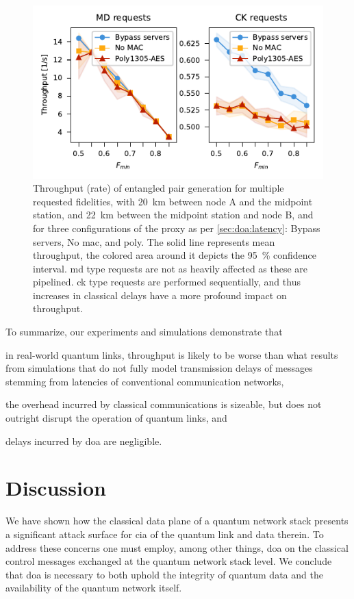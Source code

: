 \begin{figure}[t]
    \centering
    \includegraphics[width=0.6\linewidth]{figures/throughput-vs-fidelity.pdf}
    \caption{
        Throughput (rate) of entangled pair generation for multiple requested fidelities, with
        \qty{20}{\km} between node A and the midpoint station, and \qty{22}{\km} between the
        midpoint station and node B, and for three configurations of the proxy as per
        \cref{sec:doa:latency}: Bypass servers, No \acrshort{mac}, and \acrshort{poly}. The solid line
        represents mean throughput, the colored area around it depicts the \qty{95}{\percent}
        confidence interval. \Acrfull{md} type requests are not as heavily affected as these are
        pipelined. \Acrfull{ck} type requests are performed sequentially, and thus increases in
        classical delays have a more profound impact on throughput.
    }
    \label{fig:results-fidelity}
\end{figure}

To summarize, our experiments and simulations demonstrate that
%
\begin{inlinelist}
    \item in real-world quantum links, throughput is likely to be worse than what results from
          simulations that do not fully model transmission delays of messages stemming from
          latencies of conventional communication networks,
    \item the overhead incurred by classical communications is sizeable, but does not outright
          disrupt the operation of quantum links, and
    \item delays incurred by \acrlong{doa} are negligible.
\end{inlinelist}

\section{Discussion}

We have shown how the classical data plane of a quantum network stack presents a significant attack
surface for \acrlong{cia} of the quantum link and data therein. To address these concerns one must
employ, among other things, \acrlong{doa} on the classical control messages exchanged at the quantum
network stack level. We conclude that \acrlong{doa} is necessary to both uphold the integrity of
quantum data and the availability of the quantum network itself.

